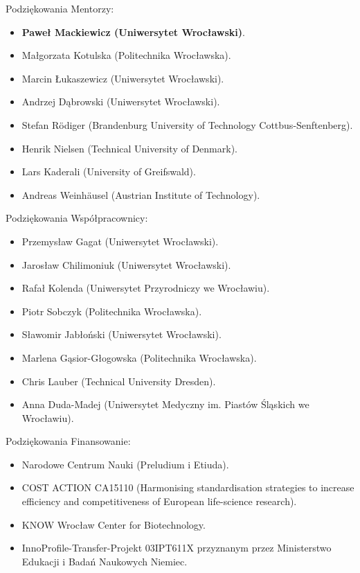 \documentclass{beamer}\usepackage[]{graphicx}\usepackage[]{color}
\begin{document}
\begin{frame}{Podziękowania}
Mentorzy:
\begin{itemize}
\item \textbf{Paweł Mackiewicz (Uniwersytet Wrocławski)}.
\item Małgorzata Kotulska (Politechnika Wrocławska).
\item Marcin Łukaszewicz (Uniwersytet Wrocławski).
\item Andrzej Dąbrowski (Uniwersytet Wrocławski).
\item Stefan Rödiger (Brandenburg University of Technology Cottbus-Senftenberg).
\item Henrik Nielsen (Technical University of Denmark).
\item Lars Kaderali (University of Greifswald).
\item Andreas Weinhäusel (Austrian Institute of Technology).
\end{itemize}
\end{frame}


\begin{frame}{Podziękowania}
Współpracownicy:
\begin{itemize}
\item Przemysław Gagat (Uniwersytet Wrocławski).
\item Jarosław Chilimoniuk (Uniwersytet Wrocławski).
\item Rafał Kolenda (Uniwersytet Przyrodniczy we Wrocławiu).
\item Piotr Sobczyk (Politechnika Wrocławska).
\item Sławomir Jabłoński (Uniwersytet Wrocławski).
\item Marlena G\k{a}sior-Głogowska (Politechnika Wrocławska).
\item Chris Lauber (Technical University Dresden).
\item Anna Duda-Madej (Uniwersytet Medyczny im. Piastów Śląskich we Wrocławiu).
\end{itemize}

\end{frame}

\begin{frame}{Podziękowania}
Finansowanie:
\begin{itemize}
\item Narodowe Centrum Nauki (Preludium i Etiuda).
\item COST ACTION CA15110 (Harmonising standardisation strategies to increase efficiency and competitiveness of European life-science research).
\item KNOW Wrocław Center for Biotechnology.
\item InnoProfile-Transfer-Projekt 03IPT611X przyznanym przez Ministerstwo Edukacji i Badań Naukowych Niemiec.
\end{itemize}

\end{frame}
\end{document}

